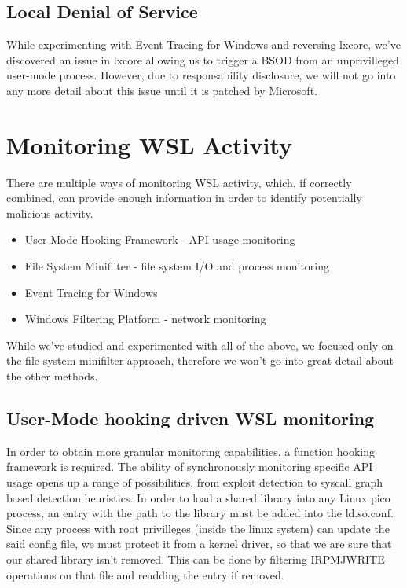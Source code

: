 \documentclass[conference]{IEEEtran}
\begin{document}
    \subsection{Local Denial of Service}
    While experimenting with Event Tracing for Windows and reversing lxcore, we've discovered an issue in lxcore allowing us to trigger a
    BSOD from an unprivilleged user-mode process. However, due to responsability disclosure, we will not go into any more
    detail about this issue until it is patched by Microsoft.\\

\section{Monitoring WSL Activity}

    There are multiple ways of monitoring WSL activity, which, if correctly combined, can provide enough information in order to identify
    potentially malicious activity.\\

    \begin{itemize}
        \item User-Mode Hooking Framework - API usage monitoring
        \item File System Minifilter - file system I/O and process monitoring
        \item Event Tracing for Windows
        \item Windows Filtering Platform - network monitoring    
    \end{itemize}

    \par{}
    While we've studied and experimented with all of the above, we focused only on the file system minifilter approach, therefore we won't go into
    great detail about the other methods.\\

\subsection{User-Mode hooking driven WSL monitoring}
    
    In order to obtain more granular monitoring capabilities, a function hooking framework is required. The ability of synchronously monitoring
    specific API usage opens up a range of possibilities, from exploit detection to syscall graph based detection heuristics.
    In order to load a shared library into any Linux pico process, an entry with the path to the library must be added into the ld.so.conf. Since
    any process with root privilleges (inside the linux system) can update the said config file, we must protect it from a kernel driver, so that
    we are sure that our shared library isn't removed. This can be done by filtering IRP\textunderscore MJ\textunderscore WRITE operations on that
    file and readding the entry if removed.\\
    
\end{document}
